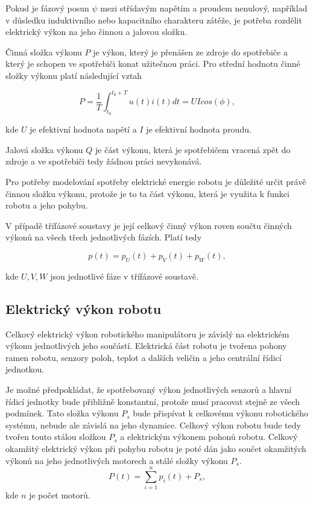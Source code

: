 Pokud je fázový posun $\psi$ mezi střídavým napětím a proudem nenulový, například v důsledku induktivního nebo kapacitního charakteru zátěže, je potřeba rozdělit elektrický výkon na jeho činnou a jalovou složku. 

Činná složka výkonu $P$ je výkon, který je přenášen ze zdroje do spotřebiče a který je schopen ve spotřebiči konat užitečnou práci. Pro střední hodnotu činné složky výkonu platí následující vztah

\begin{equation}
P = \frac{1}{T} \int_{t_0}^{t_0 + T} u(t)i(t)dt = UIcos(\phi),
\label{act_power_eq}
\end{equation}  

kde $U$ je efektivní hodnota napětí a $I$ je efektivní hodnota proudu.

Jalová složka výkonu $Q$ je část výkonu, která je spotřebičem vracená zpět do zdroje a ve spotřebiči tedy žádnou práci nevykonává.

Pro potřeby modelování spotřeby elektrické energie robotu je důležité určit právě činnou složku výkonu, protože je to ta část výkonu, která je využita k funkci robotu a jeho pohybu. 

V případě třífázové soustavy je její celkový činný výkon roven součtu činných výkonů na všech třech jednotlivých fázích. Platí tedy

\begin{equation}
p(t) = p_U(t) + p_V(t) + p_W(t),
\label{3ph_power_eq}
\end{equation}  

kde $U,V,W$ jsou jednotlivé fáze v třífázové soustavě.

\subsection{Elektrický výkon robotu}

Celkový elektrický výkon robotického manipulátoru je závislý na elektrickém výkonu jednotlivých jeho součástí. Elektrická část robotu je tvořena pohony ramen robotu, senzory poloh, teplot a dalších veličin a jeho centrální řídicí jednotkou. 

Je možné předpokládat, že spotřebovaný výkon jednotlivých senzorů a hlavní řídicí jednotky bude přibližně konstantní, protože musí pracovat stejně ze všech podmínek. Tato složka výkonu $P_s$ bude přispívat k celkovému výkonu robotického systému, nebude ale závislá na jeho dynamice. Celkový výkon robotu bude tedy tvořen touto stálou složkou $P_s$ a elektrickým výkonem pohonů robotu.
\newpage
Celkový okamžitý elektrický výkon při pohybu robotu je poté dán jako součet okamžitých výkonů na jeho jednotlivých motorech a stálé složky výkonu $P_s$.
\begin{equation}
P(t) = \sum_{i=1}^{n} p_i(t) + P_s,
\label{robot_motor_power_eq}
\end{equation} 
kde $n$ je počet motorů.

